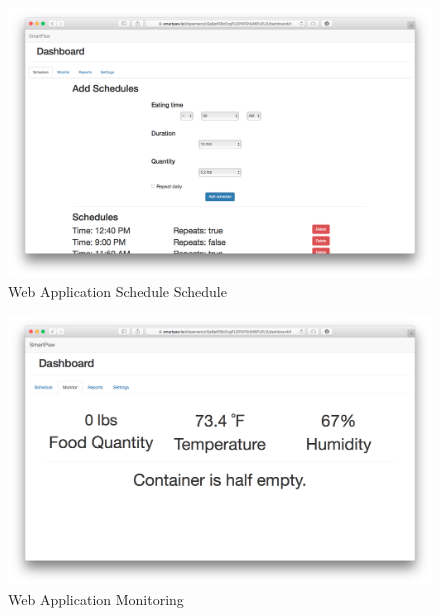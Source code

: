 \documentclass[12pt]{article}
\begin{document}
\begin{appendix}
  \begin{figure}[!htb]
    \begin{center}
        \includegraphics[scale=0.15]{Figures/WebApp3.png}
    \end{center}
    \caption{Web Application Schedule Schedule}
    \label{fig:WebApp3}
  \end{figure}

  \begin{figure}[!htb]
    \begin{center}
        \includegraphics[scale=0.15]{Figures/WebApp4.png}
    \end{center}
    \caption{Web Application Monitoring}
    \label{fig:WebApp4}
  \end{figure}


\end{appendix}
\end{document}
